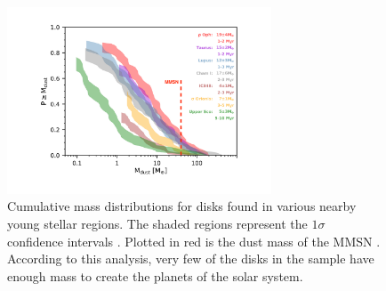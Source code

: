 \begin{figure}
    \centering
    \includegraphics[width = 0.7\textwidth]{figures/disk_mass.pdf}
    \caption{Cumulative mass distributions for disks found in various nearby young stellar regions. The shaded regions represent the $1\sigma$ confidence intervals \citep{vanterwisga2019}. Plotted in red is the dust mass of the MMSN \citep{weidenschilling1977b}. According to this analysis, very few of the disks in the sample have enough mass to create the planets of the solar system.}
    \label{fig:disk_masses}
\end{figure}

